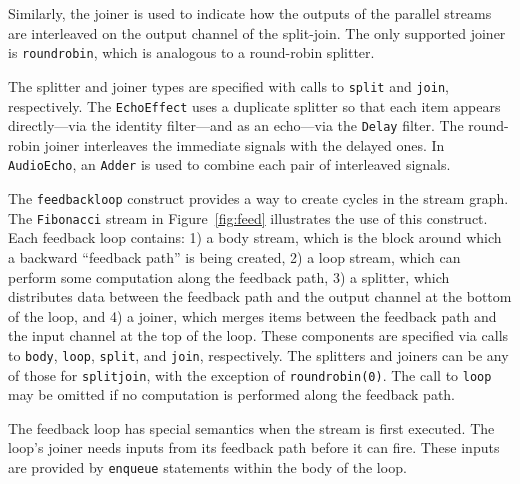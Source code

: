 Similarly,  the joiner  is used  to indicate  how the  outputs  of the
parallel  streams  are  interleaved  on  the  output  channel  of  the
split-join.  The  only supported joiner  is \texttt{roundrobin}, which
is analogous to a round-robin splitter.

The   splitter  and  joiner   types  are   specified  with   calls  to
\texttt{split}      and     \texttt{join},      respectively.      The
\texttt{EchoEffect}  uses  a  duplicate  splitter so  that  each  item
appears directly---via the identity filter---and as an echo---via the
\texttt{Delay} filter. The round-robin joiner interleaves the
immediate signals  with the  delayed ones.  In  \texttt{AudioEcho}, an
\texttt{Adder} is used to combine each pair of interleaved signals.

The \texttt{feedbackloop} construct provides a way to create cycles in
the    stream    graph.      The    \texttt{Fibonacci}    stream    in
Figure~\ref{fig:feed}  illustrates the  use of  this  construct.  Each
feedback loop  contains: 1) a body  stream, which is  the block around
which  a backward  ``feedback  path''  is being  created,  2) a  loop
stream, which can perform some computation along the feedback path, 3)
a splitter, which  distributes data between the feedback  path and the
output  channel at  the bottom  of the  loop, and  4) a  joiner, which
merges items  between the feedback path  and the input  channel at the
top  of  the  loop.   These  components are  specified  via  calls  to
\texttt{body},   \texttt{loop},  \texttt{split},   and  \texttt{join},
respectively.
%
%
The splitters and joiners can  be any of those for \texttt{splitjoin},
with   the   exception  of   \texttt{roundrobin(0)}.    The  call   to
\texttt{loop} may be omitted if no computation is performed along the
feedback path.

The  feedback loop  has special  semantics  when the  stream is  first
executed.   The loop's  joiner  needs inputs  from  its feedback  path
before  it can fire.   These inputs  are provided  by \texttt{enqueue}
statements within the body of the loop.

